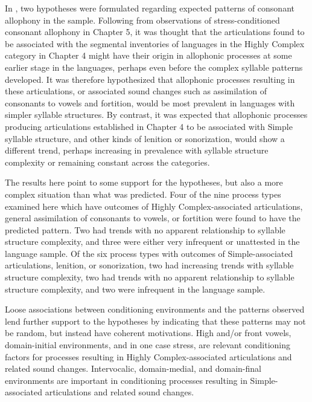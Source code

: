   In , two hypotheses were formulated regarding expected patterns of consonant allophony in the sample. Following from observations of stress-conditioned consonant allophony in Chapter 5, it was thought that the articulations found to be associated with the segmental inventories of languages in the Highly Complex category in Chapter 4 might have their origin in allophonic processes at some earlier stage in the languages, perhaps even before the complex syllable patterns developed. It was therefore hypothesized that allophonic processes resulting in these articulations, or associated sound changes such as assimilation of consonants to vowels and fortition, would be most prevalent in languages with simpler syllable structures. By contrast, it was expected that allophonic processes producing articulations established in Chapter 4 to be associated with Simple syllable structure, and other kinds of lenition or sonorization, would show a different trend, perhaps increasing in prevalence with syllable structure complexity or remaining constant across the categories.



  The results here point to some support for the hypotheses, but also a more complex situation than what was predicted. Four of the nine process types examined here which have outcomes of Highly Complex-associated articulations, general assimilation of consonants to vowels, or fortition were found to have the predicted pattern. Two had trends with no apparent relationship to syllable structure complexity, and three were either very infrequent or unattested in the language sample. Of the six process types with outcomes of Simple-associated articulations, lenition, or sonorization, two had increasing trends with syllable structure complexity, two had trends with no apparent relationship to syllable structure complexity, and two were infrequent in the language sample.



  Loose associations between conditioning environments and the patterns observed lend further support to the hypotheses by indicating that these patterns may not be random, but instead have coherent motivations. High and/or front vowels, domain-initial environments, and in one case stress, are relevant conditioning factors for processes resulting in Highly Complex-associated articulations and related sound changes. Intervocalic, domain-medial, and domain-final environments are important in conditioning processes resulting in Simple-associated articulations and related sound changes. 



